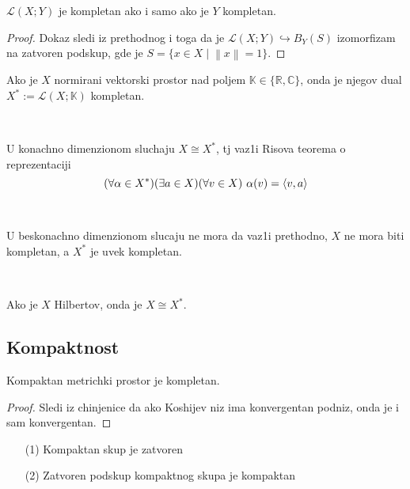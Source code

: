 \documentclass[a4paper,12pt]{article}
\newcommand{\RR}{\mathbb{R}}
\newcommand{\CC}{\mathbb{C}}
\newcommand{\norm}[1]{\left\lVert#1\right\rVert}
\begin{document}
\begin{posl}
$\mathcal{L}(X;Y)$ je kompletan ako i samo ako je $Y$ kompletan.
\end{posl}

\begin{proof}
Dokaz sledi iz prethodnog i toga da je $\mathcal{L}(X;Y)\hookrightarrow B_Y(S)$ izomorfizam na zatvoren podskup,  gde je $S = \{x \in X \mid \norm{x} = 1 \}$.
\end{proof}

\begin{nap} Ako je $X$ normirani vektorski prostor nad poljem $\mathbb{K} \in \{\RR, \CC \}$, onda je njegov dual $X^* := \mathcal{L} (X; \mathbb{K})$ kompletan.
\end{nap} \\

\begin{nap}
U konachno dimenzionom sluchaju $X \cong X^*$, tj vaz1i Risova teorema o re\-pre\-zen\-ta\-ci\-ji
\[(\forall \alpha \in X^*) (\exists a \in X) (\forall v \in X) \hspace{0.12cm} \alpha(v) = \langle v, a \rangle \]
\end{nap} \\

\begin{nap}
U beskonachno dimenzionom slucaju ne mora da vaz1i prethodno, $X$ ne mora biti kompletan, a $X^*$ je uvek kompletan.
\end{nap} \\

\begin{nap}
Ako je $X$ Hilbertov, onda je $X \cong X^*$.
\end{nap}

\subsection{Kompaktnost}

\begin{tvr}
Kompaktan metrichki prostor je kompletan.
\end{tvr}
\begin{proof}
Sledi iz chinjenice da ako Koshijev niz ima konvergentan podniz, onda je i sam konvergentan.
\end{proof}

\begin{tvr}
\begin{itemize}
\item[(1)] Kompaktan skup je zatvoren
\item[(2)] Zatvoren podskup kompaktnog skupa je kompaktan
\end{itemize}
\end{tvr}
\end{document}
